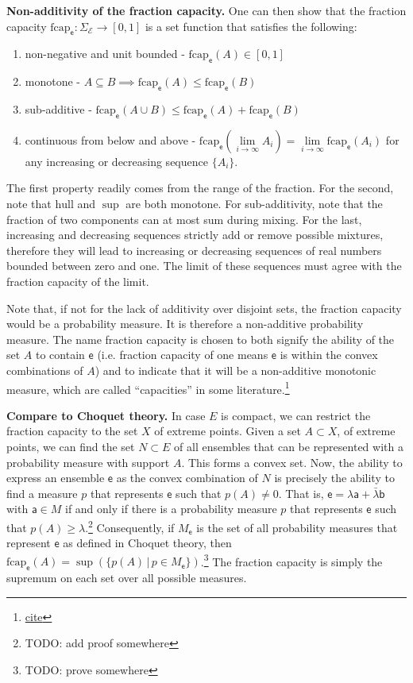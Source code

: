 \documentclass[10pt,twocolumn, nofootinbib]{revtex4-2}
\newcommand\hull{\mathrm{hull}}
\newcommand\frcap{\mathrm{fcap}}
\newcommand{\ens}[1][e] {\mathsf{#1}} %
\newcommand{\Ens}[1][E] {\mathcal{#1}} %
\begin{document}
\textbf{Non-additivity of the fraction capacity.} One can then show that the fraction capacity $\frcap_{\ens} : \Sigma_{\Ens} \to [0,1]$ is a set function that satisfies the following:
\begin{enumerate}
	\item non-negative and unit bounded - $\frcap_{\ens}(A) \in [0,1]$
	\item monotone - $A \subseteq B \implies \frcap_{\ens}(A) \leq \frcap_{\ens}(B)$
	\item sub-additive - $\frcap_{\ens}(A \cup B) \leq \frcap_{\ens}(A) + \frcap_{\ens}(B)$
	\item continuous from below and above - $\frcap_{\ens}(\lim\limits_{i \to \infty} A_i) = \lim\limits_{i \to \infty} \frcap_{\ens}(A_i)$ for any increasing or decreasing sequence $\{A_i\}$.
\end{enumerate}

The first property readily comes from the range of the fraction. For the second, note that $\hull$ and $\sup$ are both monotone. For sub-additivity, note that the fraction of two components can at most sum during mixing. For the last, increasing and decreasing sequences strictly add or remove possible mixtures, therefore they will lead to increasing or decreasing sequences of real numbers bounded between zero and one. The limit of these sequences must agree with the fraction capacity of the limit.

Note that, if not for the lack of additivity over disjoint sets, the fraction capacity would be a probability measure. It is therefore a non-additive probability measure. The name fraction capacity is chosen to both signify the ability of the set $A$ to contain $\ens$ (i.e. fraction capacity of one means $\ens$ is within the convex combinations of $A$) and to indicate that it will be a non-additive monotonic measure, which are called ``capacities'' in some literature.\footnote{ \href{ https://link.springer.com/book/10.1007/978-3-319-03155-2}{cite} }

\textbf{Compare to Choquet theory.} In case $E$ is compact, we can restrict the fraction capacity to the set $X$ of extreme points. Given a set $A \subset X$, of extreme points, we can find the set $N \subset E$ of all ensembles that can be represented with a probability measure with support $A$. This forms a convex set. Now, the ability to express an ensemble $\ens$ as the convex combination of $N$ is precisely the ability to find a measure $p$ that represents $\ens$ such that $p(A) \neq 0$. That is, $\ens = \lambda \ens[a] + \bar{\lambda} \ens[b]$ with $\ens[a] \in M$ if and only if there is a probability measure $p$ that represents $\ens$ such that $p(A) \geq \lambda$.\footnote{TODO: add proof somewhere} Consequently, if $M_{\ens}$ is the set of all probability measures that represent $\ens$ as defined in Choquet theory, then $\frcap_{\ens}(A) = \sup(\{p(A) \, | \, p \in M_{\ens}\})$.\footnote{TODO: prove somewhere} The fraction capacity is simply the supremum on each set over all possible measures.
\end{document}
